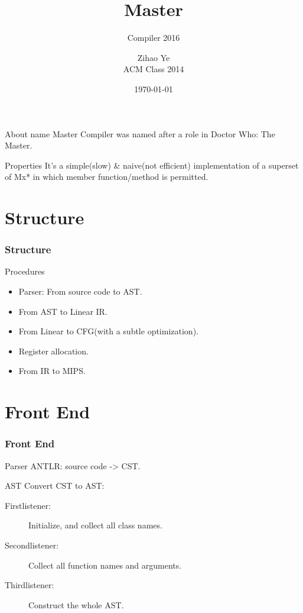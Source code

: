 \documentclass{beamer}
\begin{document}
	\begin{frame}[containsverbatim]
		\title{Master}
		\subtitle{Compiler 2016}
		\author{Zihao Ye\\ACM Class 2014}
		\date{\today}
		\titlepage
	\end{frame}

	\begin{frame}
		\begin{block}{About name}
		Master Compiler was named after a role in Doctor Who: The Master.
		\end{block}
		\begin{block}{Properties}
		It's a simple(slow) \& naive(not efficient) implementation of a superset of Mx* in which member function/method is permitted.
		\end{block}
	\end{frame}
	\section{Structure} %
	\label{sec:structure}
	
	\begin{frame}
		\frametitle{Structure}
		\begin{block}{Procedures}
		\begin{itemize}
			\item
			Parser: From source code to AST.
			\item
			From AST to Linear IR.
			\item
			From Linear to CFG(with a subtle optimization).
			\item
			Register allocation.
			\item
			From IR to MIPS.
		\end{itemize}
		\end{block}
	\end{frame}

	\section{Front End} %
	\label{sec:front_end}
	
	\begin{frame}
		\frametitle{Front End}
		\begin{block}{Parser}
		ANTLR: source code -> CST.
		\end{block}
		\pause
		\begin{block}{AST}
		Convert CST to AST:
			\begin{description}
				\item[Firstlistener:]
				
				Initialize, and collect all class names.
				\item[Secondlistener:]
				
				Collect all function names and arguments.
				\item[Thirdlistener:]
				
				Construct the whole AST.
			\end{description}
		\end{block}
	\end{frame}
\end{document}
